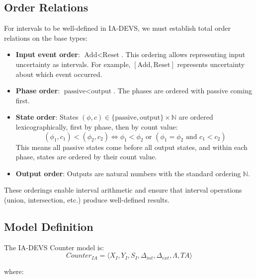 \subsection{Order Relations}

For intervals to be well-defined in IA-DEVS, we must establish total order relations on the base types:

\begin{itemize}
    \item \textbf{Input event order}: $\text{Add} < \text{Reset}$. This ordering allows representing input uncertainty as intervals. For example, $[\text{Add}, \text{Reset}]$ represents uncertainty about which event occurred.
    
    \item \textbf{Phase order}: $\text{passive} < \text{output}$. The phases are ordered with passive coming first.
    
    \item \textbf{State order}: States $(\phi, c) \in \{\text{passive}, \text{output}\} \times \mathbb{N}$ are ordered lexicographically, first by phase, then by count value:
    \[
    (\phi_1, c_1) < (\phi_2, c_2) \iff \phi_1 < \phi_2 \text{ or } (\phi_1 = \phi_2 \text{ and } c_1 < c_2)
    \]
    This means all passive states come before all output states, and within each phase, states are ordered by their count value.
    
    \item \textbf{Output order}: Outputs are natural numbers with the standard ordering $\mathbb{N}$.
\end{itemize}

These orderings enable interval arithmetic and ensure that interval operations (union, intersection, etc.) produce well-defined results.

\subsection{Model Definition}

The IA-DEVS Counter model is:
\[
Counter_{IA} = \langle X_I, Y_I, S_I, \Delta_{int}, \Delta_{ext}, \Lambda, TA \rangle
\]

where:

